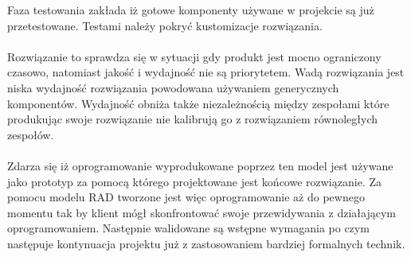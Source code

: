 Faza testowania zakłada iż gotowe komponenty używane w projekcie są już przetestowane. Testami należy pokryć kustomizacje rozwiązania. 
\paragraph{}
Rozwiązanie to sprawdza się w sytuacji gdy produkt jest mocno ograniczony czasowo, natomiast jakość i wydajność nie są priorytetem. Wadą rozwiązania jest niska wydajność rozwiązania powodowana używaniem generycznych komponentów. Wydajność obniża także niezależnością między zespołami które produkując swoje rozwiązanie nie kalibrują go z rozwiązaniem równoległych zespołów.
\paragraph{}
Zdarza się iż oprogramowanie wyprodukowane poprzez ten model jest używane jako prototyp za pomocą którego projektowane jest końcowe rozwiązanie. Za pomocu modelu RAD tworzone jest więc oprogramowanie aż do pewnego momentu tak by klient mógł skonfrontować swoje przewidywania z działającym oprogramowaniem. Następnie walidowane są wstępne wymagania po czym następuje kontynuacja projektu już z zastosowaniem bardziej formalnych technik.
